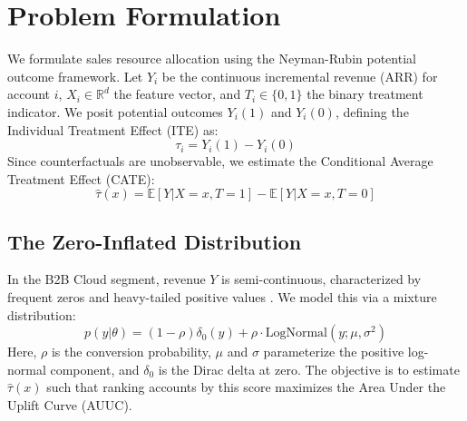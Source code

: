 \documentclass[runningheads]{llncs}
\begin{document}
\section{Problem Formulation}
We formulate sales resource allocation using the Neyman-Rubin potential outcome framework\cite{rubin2005causal}. Let $Y_i$ be the continuous incremental revenue (ARR) for account $i$, $X_i \in \mathbb{R}^d$ the feature vector, and $T_i \in \{0, 1\}$ the binary treatment indicator. We posit potential outcomes $Y_i(1)$ and $Y_i(0)$, defining the Individual Treatment Effect (ITE) as:
\begin{equation}
    \tau_i = Y_i(1) - Y_i(0)
\end{equation}
Since counterfactuals are unobservable, we estimate the Conditional Average Treatment Effect (CATE):
\begin{equation}
    \hat{\tau}(x) = \mathbb{E}[Y | X=x, T=1] - \mathbb{E}[Y | X=x, T=0]
\end{equation}

\subsection{The Zero-Inflated Distribution}
In the B2B Cloud segment, revenue $Y$ is semi-continuous, characterized by frequent zeros and heavy-tailed positive values . We model this via a mixture distribution:
\begin{equation}
    p(y | \theta) = (1 - \rho) \delta_0(y) + \rho \cdot \text{LogNormal}(y; \mu, \sigma^2)
\end{equation}
Here, $\rho$ is the conversion probability, $\mu$ and $\sigma$ parameterize the positive log-normal component, and $\delta_0$ is the Dirac delta at zero. The objective is to estimate $\hat{\tau}(x)$ such that ranking accounts by this score maximizes the Area Under the Uplift Curve (AUUC).

\end{document}
